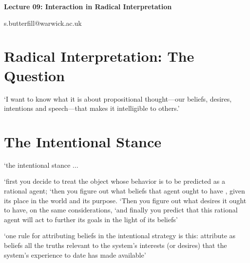 \documentclass[12pt]{extarticle}
\date{}
\makeatletter
\def \ititle {Origins of Mind}
\def \iemail{s.butterfill@warwick.ac.uk}
\makeatother
\begin{document}
\begin{multicols*}{3}

\setlength\footnotesep{1em}









\def \ititle {Lecture 09: Interaction in Radical Interpretation}

\begin{center}

{\Large

\textbf{\ititle}

}



\iemail %

\end{center}



\section{Radical Interpretation: The Question}

‘I want to know what it is about propositional thought---our beliefs, desires, intentions and speech---that makes it intelligible to others.’

\citep[p.~14]{Davidson:1995nl}


\section{The Intentional Stance}

‘the intentional stance ...

‘first you decide to treat the object whose behavior is to be predicted as a rational agent; ‘then you figure out what beliefs that agent ought to have , given its place in the world and its purpose. ‘Then you figure out what desires it ought to have, on the same considerations,
‘and finally you predict that this rational agent will act to further its goals in the light of its beliefs’
\citep[p.~17]{Dennett:1987sf}

‘one rule for attributing beliefs in the intentional strategy is this: attribute as beliefs all the truths relevant to the system's interests (or desires) that the system's experience to date has made available’ \citep[p.~18]{Dennett:1987sf}


\end{multicols*}
\end{document}
